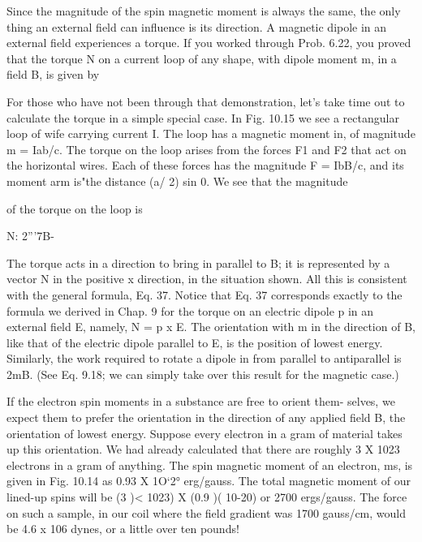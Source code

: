 Since the magnitude of the spin magnetic moment is always the
same, the only thing an external field can influence is its direction.
A magnetic dipole in an external field experiences a torque. If you
worked through Prob. 6.22, you proved that the torque N on a current
loop of any shape, with dipole moment m, in a field B, is given by

For those who have not been through that demonstration, let's take
time out to calculate the torque in a simple special case. In Fig. 10.15
we see a rectangular loop of wife carrying current I. The loop has
a magnetic moment in, of magnitude m = Iab/c. The torque on
the loop arises from the forces F1 and F2 that act on the horizontal
wires. Each of these forces has the magnitude F = IbB/c, and its
moment arm is"the distance (a/ 2) sin 0. We see that the magnitude

of the torque on the loop is
\begin{equation}
\end{equation}

N: 2'''7B-%

The torque acts in a direction to bring in parallel to B; it is represented
by a vector N in the positive x direction, in the situation
shown. All this is consistent with the general formula, Eq. 37.
Notice that Eq. 37 corresponds exactly to the formula we derived
in Chap. 9 for the torque on an electric dipole p in an external field E,
namely, N = p x E. The orientation with m in the direction of B,
like that of the electric dipole parallel to E, is the position of lowest
energy. Similarly, the work required to rotate a dipole in from parallel
to antiparallel is 2mB. (See Eq. 9.18; we can simply take over
this result for the magnetic case.)

If the electron spin moments in a substance are free to orient them-
selves, we expect them to prefer the orientation in the direction of
any applied field B, the orientation of lowest energy. Suppose every
electron in a gram of material takes up this orientation. We had
already calculated that there are roughly 3 X 1023 electrons in a gram
of anything. The spin magnetic moment of an electron, ms, is given
in Fig. 10.14 as 0.93 X 1O‘2° erg/gauss. The total magnetic moment
of our lined-up spins will be (3 )< 1023) X (0.9 )( 10-20) or 2700
ergs/gauss. The force on such a sample, in our coil where the field
gradient was 1700 gauss/cm, would be 4.6 x 106 dynes, or a little
over ten pounds!

